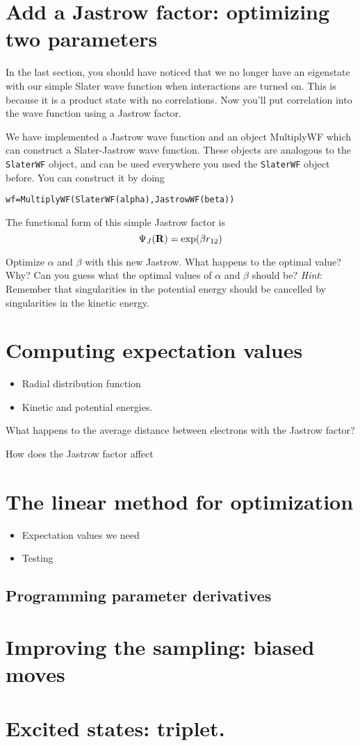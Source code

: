 \documentclass[12pt]{article}
\newcommand{\bR}{{\bf R}}
\begin{document}
\section{Add a Jastrow factor: optimizing two parameters} 

In the last section, you should have noticed that we no longer have an eigenstate with our simple Slater wave function when interactions are turned on.
This is because it is a product state with no correlations. 
Now you'll put correlation into the wave function using a Jastrow factor.

We have implemented a Jastrow wave function and an object MultiplyWF which can construct a Slater-Jastrow wave function.
These objects are analogous to the \verb|SlaterWF| object, and can be used everywhere you used the \verb|SlaterWF| object before.
You can construct it by doing
\begin{verbatim}
wf=MultiplyWF(SlaterWF(alpha),JastrowWF(beta))	
\end{verbatim}
The functional form of this simple Jastrow factor is 
\begin{equation}
\Psi_J(\bR) = \exp(\beta r_{12})	
\end{equation}

Optimize $\alpha$ and $\beta$ with this new Jastrow. What happens to the optimal value? Why? 
Can you guess what the optimal values of $\alpha$ and $\beta$ should be? 
\textit{Hint}: Remember that singularities in the potential energy should be cancelled by singularities in the kinetic energy. 

\section{Computing expectation values}

\begin{itemize}
\item Radial distribution function	
\item Kinetic and potential energies. 
\end{itemize}

What happens to the average distance between electrons with the Jastrow factor? 

How does the Jastrow factor affect 

\section{The linear method for optimization} 

\begin{itemize}
\item Expectation values we need
\item Testing 
\end{itemize}

\subsection{Programming parameter derivatives}


\section{Improving the sampling: biased moves} 

\section{Excited states: triplet. } 
\end{document}
